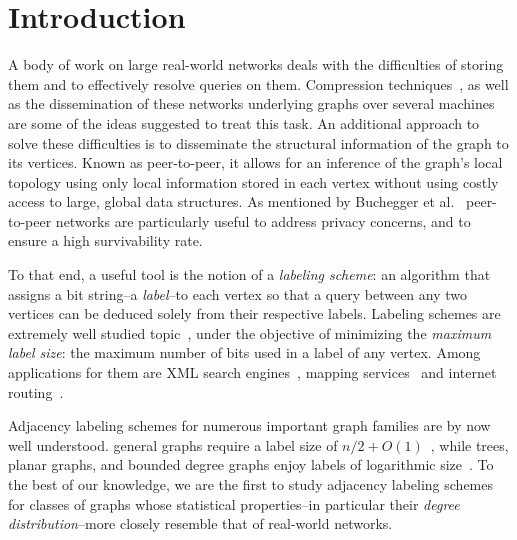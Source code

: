 

\section{Introduction}
A body of work on large real-world networks  deals with the difficulties of storing them and to effectively resolve queries on them.
Compression techniques~\cite{boldi2004webgraph,boldi2011layered}, as  well as the dissemination  of these networks underlying graphs over several machines~\cite{gonzalez2012powergraph, stanton2012streaming} are some of the ideas suggested to treat this task.
An additional  approach to solve these difficulties is to disseminate the structural information of the graph to its vertices.
 Known as peer-to-peer, it  allows for an inference of the graph's local topology  using only local information stored in each vertex without using costly access to large, global data structures. 
As mentioned by   Buchegger et al.~\cite{buchegger2009peerson}  peer-to-peer  networks are particularly useful to address privacy concerns, and to ensure a high survivability rate. 

To that end, a useful tool is the notion of a \emph{labeling scheme}: an algorithm that assigns a bit string--a \emph{label}--to each vertex so that a query between any two vertices can be deduced solely from their respective labels. 
Labeling schemes are extremely well studied topic~\cite{katz2004labeling,gavoillea2004distance,brady2006compact,gavoille2007shorter,korman2007compact,Korman07,korman2007general,caminiti2008engineering,dahlgaard2014dynamic,rotbart2014evaluation,alstrup2014adjacency}, under the objective of  minimizing the \emph{maximum label size}: the maximum number of bits used in a label of any vertex. Among applications for them are   XML search engines~\cite{cohen2010labeling}, mapping services~\cite{abraham2011hub} and internet routing~\cite{krioukov2004compact}.

Adjacency labeling schemes for  numerous important graph families are by now well understood. 
general graphs  require a label size of $n/2+O(1)$~\cite{moon1965minimal, alstrup2014adjacency}, while 
trees, planar graphs, and bounded degree graphs enjoy labels of logarithmic size~\cite{Alstrup02, gavoille2007shorter, adjiashvili2014labeling}. 
To the best of our knowledge, we are the first to study adjacency labeling schemes for classes of graphs whose statistical properties--in particular their \emph{degree distribution}--more closely resemble that of real-world networks.

